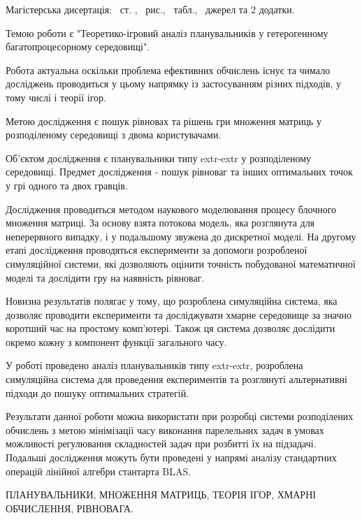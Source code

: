 
Магістерська дисертація: \pageref*{MyLastPage}~ст. , \totfig~рис.,  \tottab~табл., ~джерел та 2 додатки.

Темою роботи є "Теоретико-ігровий аналіз планувальників у гетерогенному багатопроцесорному середовищі".

Робота актуальна оскільки проблема ефективних обчислень існує та чимало досліджень проводиться у цьому напрямку із застосуванням різних підходів, у тому числі і теорії ігор.

Метою дослідження є пошук рівновах та рішень гри множення матриць у розподіленому середовищі з двома користувачами.

Об'єктом дослідження є планувальники типу extr-extr у розподіленому середовищі. Предмет дослідження - пошук рівноваг та інших оптимальних точок у грі одного та двох гравців.

Дослідження проводиться методом наукового моделювання процесу блочного множення матриці. За основу взята потокова модель, яка розглянута для неперервного випадку, і у подальшому звужена до дискретної моделі. На другому етапі дослідження проводяться експерименти за допомоги розробленої симуляційної системи, які дозволяють оцінити точність побудованої математичної моделі та дослідити гру на наявність рівноваг.

Новизна результатів полягає у тому, що розроблена симуляційна система, яка дозволяє проводити експерименти та досліджувати хмарне середовище за значно коротший час на простому комп'ютері. Також ця система дозволяє дослідити окремо кожну з компонент функції загального часу.

У роботі проведено аналіз планувальників типу extr-extr, розроблена симуляційна система для проведення експериментів та розглянуті альтернативні підходи до пошуку оптимальних стратегій.

Результати данної роботи можна використати при розробці системи розподілених обчислень з метою мінімізації часу виконання парелельних задач в умовах можливості регулювання складностей задач при розбитті їх на підзадачі. Подальші дослідження можуть бути проведені у напрямі аналізу стандартних операцій лінійної алгебри стантарта BLAS.

\MakeUppercase{планувальники, множення матриць, теорія ігор, хмарні обчислення, рівновага.}